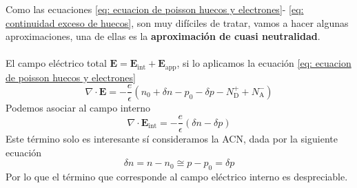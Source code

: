 \noindent Como las ecuaciones \ref{eq: ecuacion de poisson huecos y electrones}- \ref{eq: continuidad exceso de huecos}, son muy difíciles de tratar, vamos a hacer algunas aproximaciones, una de ellas es la \textbf{aproximación de cuasi neutralidad}.\\\\
\noindent El campo eléctrico total $\mathbf{E}=\mathbf{E_\mathrm{int}}+ \mathbf{E_\mathrm{app}}$, si lo aplicamos la ecuación \ref{eq: ecuacion de poisson huecos y electrones} $$\nabla \cdot \mathbf{E}=-\frac{e}{\epsilon} (n_0+\delta n-p_0 -\delta p -N_\mathrm{D}^++N_\mathrm{A}^-)$$
Podemos asociar al campo interno
\begin{equation}
    \nabla \cdot \mathbf{E_\mathrm{int}}=-\frac{e}{\epsilon}(\delta n-\delta p)
\end{equation}
Este término solo es interesante sí consideramos la ACN, dada por la siguiente ecuación
\begin{equation}
    \delta n =n-n_0 \cong p-p_0 =\delta p
\end{equation}
Por lo que el término que corresponde al campo eléctrico interno es despreciable. \newpage

